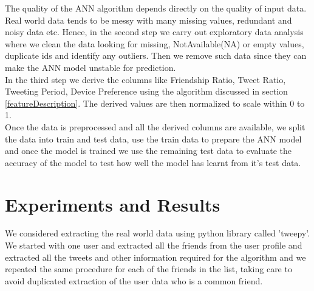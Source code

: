 \documentclass[conference]{IEEEtran}
\begin{document}
The quality of the ANN algorithm depends directly on the quality of input data. Real world data tends to be messy with many missing values, redundant and noisy data etc. Hence, in the second step we carry out exploratory data analysis where we clean the data looking for missing, NotAvailable(NA) or empty values, duplicate ids and identify any outliers. Then we remove such data since they can make the ANN model unstable for prediction.\\

In the third step we derive the columns like Friendship Ratio, Tweet Ratio, Tweeting Period, Device Preference using the algorithm discussed in section \ref{featureDescription}. The derived values are then normalized to scale within 0 to 1. \\

Once the data is preprocessed and all the derived columns are available, we split the data into train and test data, use the train data to prepare the ANN model and once the model is trained we use the remaining test data to evaluate the 
accuracy of the model to test how well the model has learnt from it's test data.
 
\section{Experiments and Results}
	  We considered extracting the real world data using python library called 'tweepy'. We started with one user and extracted all the friends from the user profile and extracted all the tweets and other information required for the algorithm and we repeated the same procedure for each of the friends in the list, taking care to avoid 
	  duplicated extraction of the user data who is a common friend. \\\\\\\\\\\\\\\\\\\\\\\\\\\\\\\\\\\\\\\\\\\\\\\\\\\\
 
\end{document}
